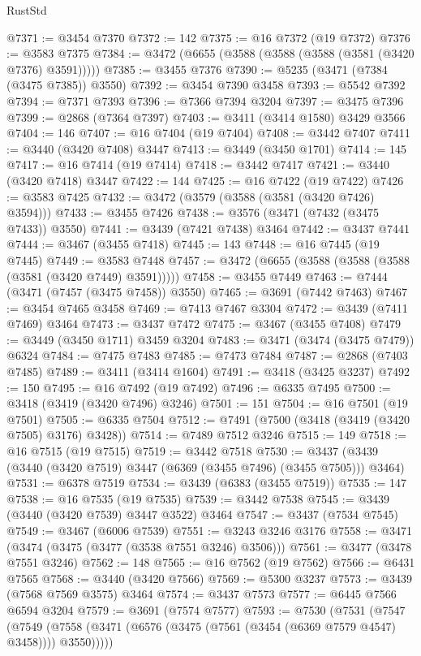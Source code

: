 \begin{lexlean}{RustStd}
\begin{coremodule}
{{{{{{{{{{{{{{{{{{{@7371 := @3454 @7370
@7372 := 142
@7375 := @16 @7372 (@19 @7372)
@7376 := @3583 @7375
@7384 := @3472 (@6655 (@3588 (@3588 (@3588 (@3581 (@3420 @7376) @3591)))))
@7385 := @3455 @7376
@7390 := @5235 (@3471 (@7384 (@3475 @7385)) @3550)
@7392 := @3454 @7390 @3458
@7393 := @5542 @7392
@7394 := @7371 @7393
@7396 := @7366 @7394 @3204
@7397 := @3475 @7396
@7399 := @2868 (@7364 @7397)
@7403 := @3411 (@3414 @1580) @3429 @3566
@7404 := 146
@7407 := @16 @7404 (@19 @7404)
@7408 := @3442 @7407
@7411 := @3440 (@3420 @7408) @3447
@7413 := @3449 (@3450 @1701)
@7414 := 145
@7417 := @16 @7414 (@19 @7414)
@7418 := @3442 @7417
@7421 := @3440 (@3420 @7418) @3447
@7422 := 144
@7425 := @16 @7422 (@19 @7422)
@7426 := @3583 @7425
@7432 := @3472 (@3579 (@3588 (@3581 (@3420 @7426) @3594)))
@7433 := @3455 @7426
@7438 := @3576 (@3471 (@7432 (@3475 @7433)) @3550)
@7441 := @3439 (@7421 @7438) @3464
@7442 := @3437 @7441
@7444 := @3467 (@3455 @7418)
@7445 := 143
@7448 := @16 @7445 (@19 @7445)
@7449 := @3583 @7448
@7457 := @3472 (@6655 (@3588 (@3588 (@3588 (@3581 (@3420 @7449) @3591)))))
@7458 := @3455 @7449
@7463 := @7444 (@3471 (@7457 (@3475 @7458)) @3550)
@7465 := @3691 (@7442 @7463)
@7467 := @3454 @7465 @3458
@7469 := @7413 @7467 @3304
@7472 := @3439 (@7411 @7469) @3464
@7473 := @3437 @7472
@7475 := @3467 (@3455 @7408)
@7479 := @3449 (@3450 @1711) @3459 @3204
@7483 := @3471 (@3474 (@3475 @7479)) @6324
@7484 := @7475 @7483
@7485 := @7473 @7484
@7487 := @2868 (@7403 @7485)
@7489 := @3411 (@3414 @1604)
@7491 := @3418 (@3425 @3237)
@7492 := 150
@7495 := @16 @7492 (@19 @7492)
@7496 := @6335 @7495
@7500 := @3418 (@3419 (@3420 @7496) @3246)
@7501 := 151
@7504 := @16 @7501 (@19 @7501)
@7505 := @6335 @7504
@7512 := @7491 (@7500 (@3418 (@3419 (@3420 @7505) @3176) @3428))
@7514 := @7489 @7512 @3246
@7515 := 149
@7518 := @16 @7515 (@19 @7515)
@7519 := @3442 @7518
@7530 := @3437 (@3439 (@3440 (@3420 @7519) @3447 (@6369 (@3455 @7496) (@3455 @7505))) @3464)
@7531 := @6378 @7519
@7534 := @3439 (@6383 (@3455 @7519))
@7535 := 147
@7538 := @16 @7535 (@19 @7535)
@7539 := @3442 @7538
@7545 := @3439 (@3440 (@3420 @7539) @3447 @3522) @3464
@7547 := @3437 (@7534 @7545)
@7549 := @3467 (@6006 @7539)
@7551 := @3243 @3246 @3176
@7558 := @3471 (@3474 (@3475 (@3477 (@3538 @7551 @3246) @3506)))
@7561 := @3477 (@3478 @7551 @3246)
@7562 := 148
@7565 := @16 @7562 (@19 @7562)
@7566 := @6431 @7565
@7568 := @3440 (@3420 @7566)
@7569 := @5300 @3237
@7573 := @3439 (@7568 @7569 @3575) @3464
@7574 := @3437 @7573
@7577 := @6445 @7566 @6594 @3204
@7579 := @3691 (@7574 @7577)
@7593 := @7530
    (@7531
      (@7547
        (@7549 (@7558 (@3471 (@6576 (@3475 (@7561 (@3454 (@6369 @7579 @4547) @3458)))) @3550)))))
}}}}}}}}}}}}}}}}}}}
\end{coremodule}
\end{lexlean}
